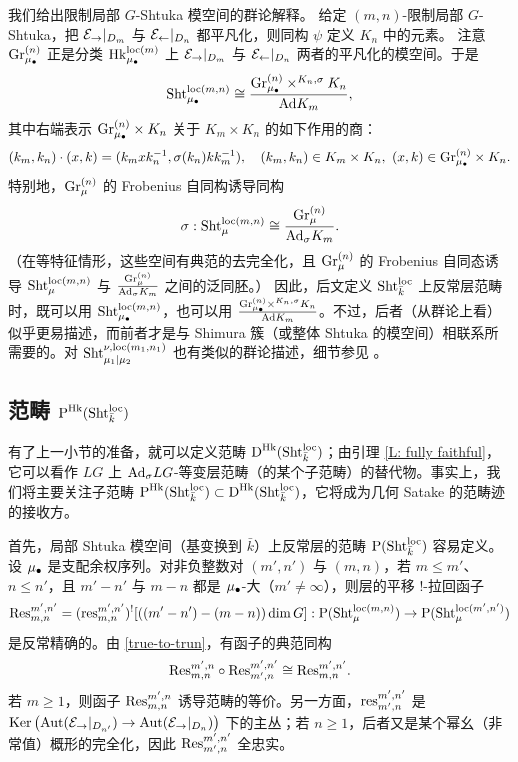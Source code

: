 \begin{remark}
\label{R: grp theoretical Sht}
我们给出限制局部 $G$-Shtuka 模空间的群论解释。
给定 $(m,n)$-限制局部 $G$-Shtuka，把 $\mathcal{E}_\to|_{D_{m}}$ 与 $\mathcal{E}_\leftarrow|_{D_{n}}$ 都平凡化，则同构 $\psi$ 定义 $K_n$ 中的元素。
注意 ${\operatorname{Gr}}_{\mu_\bullet}^{(n)}$ 正是分类 ${\operatorname{Hk}}^{\mathrm{loc}(m)}_{\mu_\bullet}$ 上 $\mathcal{E}_\to|_{D_{m}}$ 与 $\mathcal{E}_\leftarrow|_{D_{n}}$ 两者的平凡化的模空间。于是
\[
\operatorname{Sht}_{{\mu_\bullet}}^{\mathrm{loc}(m,n)}\cong \frac{{\operatorname{Gr}}^{(n)}_{{\mu_\bullet}}\times^{K_n,\sigma} K_n}{{\operatorname{Ad}} K_m},
\]
其中右端表示 ${\operatorname{Gr}}_{{\mu_\bullet}}^{(n)}\times K_n$ 关于 $K_m\times K_n$ 的如下作用的商：
$$(k_m,k_n)\cdot (x,k)=(k_mxk_n^{-1},\sigma(k_n)kk_m^{-1}), \quad (k_m,k_n)\in K_m\times K_n, \ (x,k)\in {\operatorname{Gr}}_{\mu_\bullet}^{(n)}\times K_n.$$
特别地，${\operatorname{Gr}}_{\mu}^{(n)}$ 的 Frobenius 自同构诱导同构
\[\sigma: \operatorname{Sht}_\mu^{\mathrm{loc}(m,n)}\cong \frac{{\operatorname{Gr}}_{\mu}^{(n)}}{{\operatorname{Ad}}_\sigma K_m}.\]
（在等特征情形，这些空间有典范的去完全化，且 ${\operatorname{Gr}}_{\mu}^{(n)}$ 的 Frobenius 自同态诱导 $\operatorname{Sht}_\mu^{\mathrm{loc}(m,n)}$ 与 $\frac{{\operatorname{Gr}}_{\mu}^{(n)}}{{\operatorname{Ad}}_\sigma K_m}$ 之间的泛同胚。）
因此，后文定义 $\operatorname{Sht}^{\mathrm{loc}}_{\bar k}$ 上反常层范畴时，既可以用 $\operatorname{Sht}_{{\mu_\bullet}}^{\mathrm{loc}(m,n)}$，也可以用 $\frac{{\operatorname{Gr}}^{(n)}_{{\mu_\bullet}}\times^{K_n,\sigma} K_n}{{\operatorname{Ad}} K_m}$。不过，后者（从群论上看）似乎更易描述，而前者才是与 Shimura 簇（或整体 Shtuka 的模空间）相联系所需要的。对 $\operatorname{Sht}_{\mu_1\mid \mu_2}^{\nu,\mathrm{loc}(m_1,n_1)}$ 也有类似的群论描述，细节参见 \cite[注 5.3.15]{XZ}。
\end{remark}

\subsection{范畴 $\operatorname{P}^{\operatorname{Hk}}(\operatorname{Sht}^{\mathrm{loc}}_{\bar k})$}
有了上一小节的准备，就可以定义范畴 $\operatorname{D}^{\operatorname{Hk}}(\operatorname{Sht}^{\mathrm{loc}}_{\bar k})$；由引理 \ref{L: fully faithful}，它可以看作 $LG$ 上 ${\operatorname{Ad}}_\sigma LG$-等变层范畴（的某个子范畴）的替代物。事实上，我们将主要关注子范畴 $\operatorname{P}^{{\operatorname{Hk}}}(\operatorname{Sht}^{\mathrm{loc}}_{\bar k})\subset \operatorname{D}^{\operatorname{Hk}}(\operatorname{Sht}^{\mathrm{loc}}_{\bar k})$，它将成为几何 Satake 的范畴迹的接收方。

首先，局部 Shtuka 模空间（基变换到 $\bar k$）上反常层的范畴 $\mathrm{P}(\operatorname{Sht}_{\bar k}^{\mathrm{loc}})$ 容易定义。
设 ${\mu_\bullet}$ 是支配余权序列。对非负整数对 $(m',n')$ 与 $(m,n)$，若 $m \leq m'$、$n\leq n'$，且 $m'-n'$ 与 $m-n$ 都是 ${\mu_\bullet}$-大（$m'\neq \infty$），则层的平移 $!$-拉回函子
$${\operatorname{Res}}^{m',n'}_{m,n}=({\operatorname{res}}^{m',n'}_{m,n})^![((m'-n')-(m-n))\dim G]:\operatorname{P}(\operatorname{Sht}^{\mathrm{loc}(m,n)}_{\mu})\to \operatorname{P}(\operatorname{Sht}^{\mathrm{loc}(m',n')}_{\mu})$$
是反常精确的。由 \eqref{true-to-trun}，有函子的典范同构
\[{\operatorname{Res}}^{m',n}_{m,n}\circ{\operatorname{Res}}^{m',n'}_{m',n}\cong {\operatorname{Res}}^{m',n'}_{m,n}.\]
若 $m\geq 1$，则函子 ${\operatorname{Res}}^{m',n}_{m,n}$ 诱导范畴的等价。另一方面，${\operatorname{res}}^{m',n'}_{m',n}$ 是 $\operatorname{Ker}\big( {\operatorname{Aut}}(\mathcal{E}_\to|_{D_{n'}}) \to {\operatorname{Aut}}(\mathcal{E}_\to|_{D_{n}}) \big)$ 下的主丛；若 $n\geq 1$，后者又是某个幂幺（非常值）概形的完全化，因此 ${\operatorname{Res}}^{m',n'}_{m',n}$ 全忠实。

